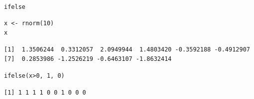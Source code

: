 \documentclass[xcolor={usenames,svgnames,dvipsnames}]{beamer}
\begin{document}
\begin{frame}[fragile,label=sec-4-4-2]{\texttt{ifelse}}
 \lstset{language=R,label= ,caption= ,numbers=none}
\begin{lstlisting}
x <- rnorm(10)
x
\end{lstlisting}

\begin{verbatim}
[1]  1.3506244  0.3312057  2.0949944  1.4803420 -0.3592188 -0.4912907
[7]  0.2853986 -1.2526219 -0.6463107 -1.8632414
\end{verbatim}

\lstset{language=R,label= ,caption= ,numbers=none}
\begin{lstlisting}
ifelse(x>0, 1, 0)
\end{lstlisting}

\begin{verbatim}
[1] 1 1 1 1 0 0 1 0 0 0
\end{verbatim}
\end{frame}
\end{document}

